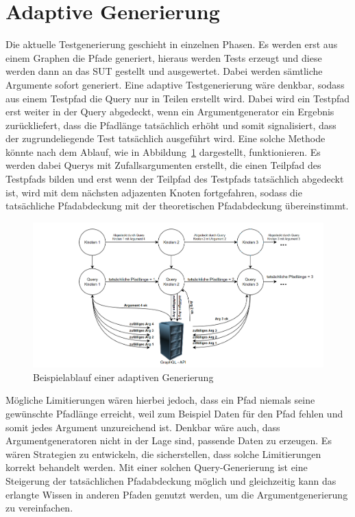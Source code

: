 \section{Adaptive Generierung}

Die aktuelle Testgenerierung geschieht in einzelnen Phasen.
Es werden erst aus einem Graphen die Pfade generiert, hieraus werden Tests erzeugt und diese werden dann an das SUT gestellt und ausgewertet.
Dabei werden sämtliche Argumente sofort generiert.
Eine adaptive Testgenerierung wäre denkbar, sodass aus einem Testpfad die Query nur in Teilen erstellt wird.
Dabei wird ein Testpfad erst weiter in der Query abgedeckt, wenn ein Argumentgenerator ein Ergebnis zurückliefert, dass die Pfadlänge tatsächlich erhöht und somit signalisiert, dass der zugrundeliegende Test tatsächlich ausgeführt wird.
Eine solche Methode könnte nach dem Ablauf, wie in Abbildung~\ref{adaptive} dargestellt, funktionieren.
Es werden dabei Querys mit Zufallsargumenten erstellt, die einen Teilpfad des Testpfads bilden und erst wenn der Teilpfad des Testpfads tatsächlich abgedeckt ist, wird mit dem nächsten adjazenten Knoten fortgefahren,
sodass die tatsächliche Pfadabdeckung mit der theoretischen Pfadabdeckung übereinstimmt.

\begin{figure}[H]
    \begin{center}
        \includegraphics[width=\textwidth,keepaspectratio]{img/ablauffuturework}
    \end{center}
    \caption{Beispielablauf einer adaptiven Generierung}
    \label{adaptive}
\end{figure}

Mögliche Limitierungen wären hierbei jedoch, dass ein Pfad niemals seine gewünschte Pfadlänge erreicht, weil zum Beispiel Daten für den Pfad fehlen und somit jedes Argument unzureichend ist.
Denkbar wäre auch, dass Argumentgeneratoren nicht in der Lage sind, passende Daten zu erzeugen.
Es wären Strategien zu entwickeln, die sicherstellen, dass solche Limitierungen korrekt behandelt werden.
Mit einer solchen Query-Generierung ist eine Steigerung der tatsächlichen Pfadabdeckung möglich und gleichzeitig kann das erlangte Wissen in anderen Pfaden genutzt werden, um die Argumentgenerierung zu vereinfachen.




